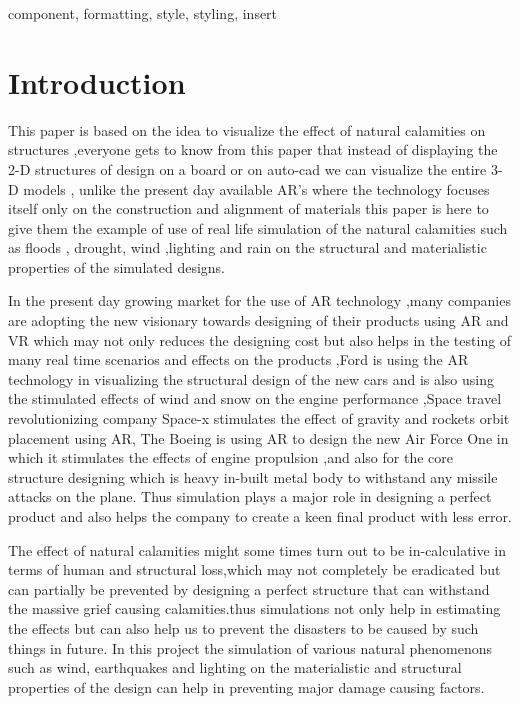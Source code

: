 \documentclass[conference]{IEEEtran}
\begin{document}
\begin{IEEEkeywords}
component, formatting, style, styling, insert
\end{IEEEkeywords}

\section{Introduction}
This paper is based on the idea to visualize the effect of natural calamities on structures ,everyone gets to know from 
this paper that instead of displaying the 2-D structures of design on a board or on auto-cad we can visualize the entire 3-D models , unlike the present 
day available AR's where the technology focuses itself only on the construction and alignment of materials this paper is here to give them the
 example of use of real life simulation of the natural calamities such as floods , drought, wind ,lighting and rain on the structural and materialistic properties of the 
 simulated designs. 
 
In the present day growing market for the use of AR technology ,many companies are adopting the new visionary towards designing of their 
products using AR and VR which may not only reduces the designing cost but also helps in the testing of many real time scenarios and effects on the products
,Ford is using the AR technology in visualizing the structural design of the new cars and is also using the stimulated effects of wind and snow on 
the engine performance ,Space travel revolutionizing company Space-x stimulates the effect of gravity and rockets orbit placement using AR, 
The Boeing is using AR to design the new Air Force One in which it stimulates the effects of engine propulsion ,and also for the core structure designing
 which is heavy in-built metal body to withstand any missile attacks on the plane. Thus simulation plays a major role in designing a perfect product and also helps 
 the company to create a keen final product with less error.

The effect of natural calamities might some times turn out to be in-calculative in terms of human and structural loss,which may not completely be eradicated but
can partially be prevented by designing a perfect structure that can withstand the massive grief causing calamities.thus simulations not only help in
estimating the effects but can also help us to prevent the disasters to be caused by such things in future. In this project the simulation of various natural phenomenons  
such as wind, earthquakes and lighting on the materialistic and structural properties of the design can help in preventing major damage causing factors.
\end{document}
